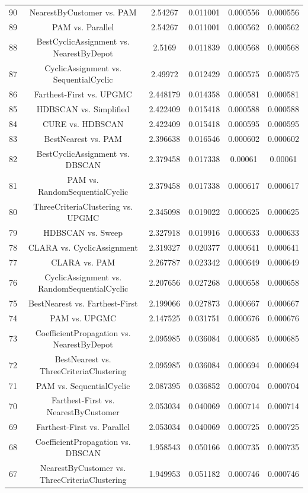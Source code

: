\documentclass[a4paper,10pt]{article}
\begin{document}
\begin{landscape}
\begin{table}[!htp]
\begin{tabular}{cccccc}
90&NearestByCustomer vs. PAM&2.54267&0.011001&0.000556&0.000556\\
89&PAM vs. Parallel&2.54267&0.011001&0.000562&0.000562\\
88&BestCyclicAssignment vs. NearestByDepot&2.5169&0.011839&0.000568&0.000568\\
87&CyclicAssignment vs. SequentialCyclic&2.49972&0.012429&0.000575&0.000575\\
86&Farthest-First vs. UPGMC&2.448179&0.014358&0.000581&0.000581\\
85&HDBSCAN vs. Simplified&2.422409&0.015418&0.000588&0.000588\\
84&CURE vs. HDBSCAN&2.422409&0.015418&0.000595&0.000595\\
83&BestNearest vs. PAM&2.396638&0.016546&0.000602&0.000602\\
82&BestCyclicAssignment vs. DBSCAN&2.379458&0.017338&0.00061&0.00061\\
81&PAM vs. RandomSequentialCyclic&2.379458&0.017338&0.000617&0.000617\\
80&ThreeCriteriaClustering vs. UPGMC&2.345098&0.019022&0.000625&0.000625\\
79&HDBSCAN vs. Sweep&2.327918&0.019916&0.000633&0.000633\\
78&CLARA vs. CyclicAssignment&2.319327&0.020377&0.000641&0.000641\\
77&CLARA vs. PAM&2.267787&0.023342&0.000649&0.000649\\
76&CyclicAssignment vs. RandomSequentialCyclic&2.207656&0.027268&0.000658&0.000658\\
75&BestNearest vs. Farthest-First&2.199066&0.027873&0.000667&0.000667\\
74&PAM vs. UPGMC&2.147525&0.031751&0.000676&0.000676\\
73&CoefficientPropagation vs. NearestByDepot&2.095985&0.036084&0.000685&0.000685\\
72&BestNearest vs. ThreeCriteriaClustering&2.095985&0.036084&0.000694&0.000694\\
71&PAM vs. SequentialCyclic&2.087395&0.036852&0.000704&0.000704\\
70&Farthest-First vs. NearestByCustomer&2.053034&0.040069&0.000714&0.000714\\
69&Farthest-First vs. Parallel&2.053034&0.040069&0.000725&0.000725\\
68&CoefficientPropagation vs. DBSCAN&1.958543&0.050166&0.000735&0.000735\\
67&NearestByCustomer vs. ThreeCriteriaClustering&1.949953&0.051182&0.000746&0.000746\\

\end{tabular}
\end{table}
\end{landscape}
\end{document}
